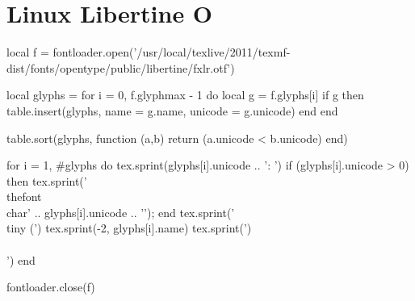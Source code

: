 \documentclass[10pt,landscape]{article}
\begin{document}
\section*{Linux Libertine O}
\begin{multicols}{7}\noindent
\begin{luacode*}
local f = fontloader.open('/usr/local/texlive/2011/texmf-dist/fonts/opentype/public/libertine/fxlr.otf')

local glyphs = {}
for i = 0, f.glyphmax - 1 do
   local g = f.glyphs[i]
   if g then
       table.insert(glyphs, {name = g.name, unicode = g.unicode})
   end
end

table.sort(glyphs, function (a,b) return (a.unicode < b.unicode) end)

for i = 1, #glyphs do
   tex.sprint(glyphs[i].unicode .. ': ')
   if (glyphs[i].unicode > 0) then
       tex.sprint('{\\thefont\\char' .. glyphs[i].unicode .. '}');
   end
   tex.sprint(' {\\tiny (')
   tex.sprint(-2, glyphs[i].name)
   tex.sprint(')}\\\\')
end

fontloader.close(f)
\end{luacode*}
\end{multicols}
\end{document}
